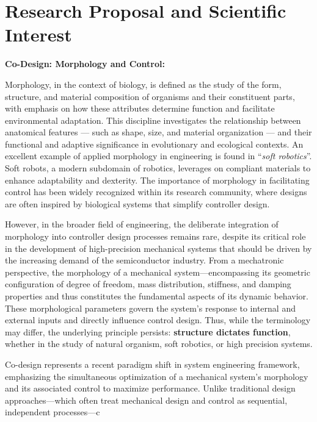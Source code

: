 \hypertarget{research-proposal-and-scientific-interest}{%
\section{Research Proposal and Scientific
Interest}\label{research-proposal-and-scientific-interest}}

\textbf{Co-Design: Morphology and Control:}

Morphology, in the context of biology, is defined as the study of the
form, structure, and material composition of organisms and their
constituent parts, with emphasis on how these attributes determine
function and facilitate environmental adaptation. This discipline
investigates the relationship between anatomical features --- such as
shape, size, and material organization --- and their functional and
adaptive significance in evolutionary and ecological contexts. An
excellent example of applied morphology in engineering is found in
``\textit{soft robotics}''. Soft robots, a modern subdomain of robotics,
leverages on compliant materials to enhance adaptability and dexterity.
The importance of morphology in facilitating control has been widely
recognized within its research community, where designs are often
inspired by biological systems that simplify controller design.

However, in the broader field of engineering, the deliberate integration
of morphology into controller design processes remains rare, despite its
critical role in the development of high-precision mechanical systems
that should be driven by the increasing demand of the semiconductor
industry. From a mechatronic perspective, the morphology of a mechanical
system---encompassing its geometric configuration of degree of freedom,
mass distribution, stiffness, and damping properties and thus
constitutes the fundamental aspects of its dynamic behavior. These
morphological parameters govern the system's response to internal and
external inputs and directly influence control design. Thus, while the
terminology may differ, the underlying principle persists:
\textbf{structure dictates function}, whether in the study of natural
organism, soft robotics, or high precision systems.

Co-design represents a recent paradigm shift in system engineering
framework, emphasizing the simultaneous optimization of a mechanical
system's morphology and its associated control to maximize performance.
Unlike traditional design approaches---which often treat mechanical
design and control as sequential, independent processes---c
